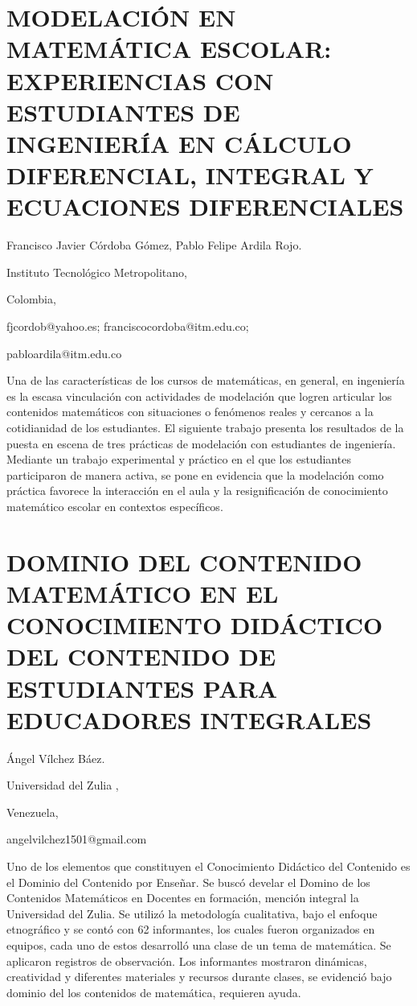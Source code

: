 \section{MODELACIÓN EN MATEMÁTICA ESCOLAR: EXPERIENCIAS CON ESTUDIANTES DE
INGENIERÍA EN CÁLCULO DIFERENCIAL, INTEGRAL Y ECUACIONES DIFERENCIALES}

\begin{datos}

Francisco Javier Córdoba Gómez, Pablo Felipe Ardila Rojo.

Instituto Tecnológico Metropolitano,

Colombia,

fjcordob@yahoo.es; franciscocordoba@itm.edu.co;

pabloardila@itm.edu.co 

\end{datos}

Una de las características de los cursos de matemáticas, en general,
en ingeniería es la escasa vinculación con actividades de modelación
que logren articular los contenidos matemáticos con situaciones o
fenómenos reales y cercanos a la cotidianidad de los estudiantes.
El siguiente trabajo presenta los resultados de la puesta en escena
de tres prácticas de modelación con estudiantes de ingeniería. Mediante
un trabajo experimental y práctico en el que los estudiantes participaron
de manera activa, se pone en evidencia que la modelación como práctica
favorece la interacción en el aula y la resignificación de conocimiento
matemático escolar en contextos específicos.


\section{DOMINIO DEL CONTENIDO MATEMÁTICO EN EL CONOCIMIENTO DIDÁCTICO DEL
CONTENIDO DE ESTUDIANTES PARA EDUCADORES INTEGRALES }

\begin{datos}

Ángel Vílchez Báez. 

Universidad del Zulia ,

Venezuela,

angelvilchez1501@gmail.com

\end{datos}

Uno de los elementos que constituyen el Conocimiento Didáctico del
Contenido es el Dominio del Contenido por Enseñar. Se buscó develar
el Domino de los Contenidos Matemáticos en Docentes en formación,
mención integral la Universidad del Zulia. Se utilizó la metodología
cualitativa, bajo el enfoque etnográfico y se contó con 62 informantes,
los cuales fueron organizados en equipos, cada uno de estos desarrolló
una clase de un tema de matemática. Se aplicaron registros de observación.
Los informantes mostraron dinámicas, creatividad y diferentes materiales
y recursos durante clases, se evidenció bajo dominio del los contenidos
de matemática, requieren ayuda.



